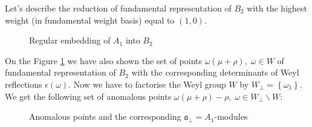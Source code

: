 \documentclass[a4paper,12pt]{article}
\theoremstyle{definition} \newtheorem{Def}{Definition}
\begin{document}
Let's describe the reduction of fundamental representation of $B_2$ with the highest weight (in fundamental weight basis) equal to $(1,0)$.
\begin{figure}[ph]
  \noindent{}
  \caption{Regular embedding of $A_1$ into $B_2$}
  \label{fig:B2_A1}
\end{figure}
On the Figure \ref{fig:B2_A1} we have also shown the set of points $\omega(\mu+\rho),\; \omega\in W$ of fundamental representation of $B_2$ with the corresponding determinants of Weyl reflections $\epsilon(\omega)$. 
Now we have to factorise the Weyl group $W$ by $W_{\bot}=\left\{\omega_1\right\}$. We get the following set of anomalous points $\omega(\mu+\rho)-\rho,\; \omega\in W_{\bot}\backslash W$:
\begin{figure}[ph]
  \noindent{}
  \caption{Anomalous points and the corresponding $\mathfrak{a}_{\bot}=A_1$-modules}
  \label{fig:B2_A1_2}
\end{figure}
\end{document}
